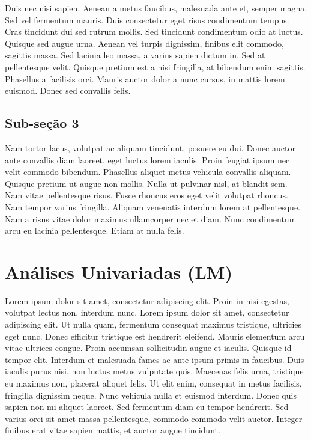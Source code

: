 \documentclass[]{book}
\begin{document}
Duis nec nisi sapien. Aenean a metus faucibus, malesuada ante et, semper magna. Sed vel fermentum mauris. Duis consectetur eget risus condimentum tempus. Cras tincidunt dui sed rutrum mollis. Sed tincidunt condimentum odio at luctus. Quisque sed augue urna. Aenean vel turpis dignissim, finibus elit commodo, sagittis massa. Sed lacinia leo massa, a varius sapien dictum in. Sed at pellentesque velit. Quisque pretium est a nisi fringilla, at bibendum enim sagittis. Phasellus a facilisis orci. Mauris auctor dolor a nunc cursus, in mattis lorem euismod. Donec sed convallis felis.

\hypertarget{sub-seuxe7uxe3o-3}{%
\section{Sub-seção 3}\label{sub-seuxe7uxe3o-3}}

Nam tortor lacus, volutpat ac aliquam tincidunt, posuere eu dui. Donec auctor ante convallis diam laoreet, eget luctus lorem iaculis. Proin feugiat ipsum nec velit commodo bibendum. Phasellus aliquet metus vehicula convallis aliquam. Quisque pretium ut augue non mollis. Nulla ut pulvinar nisl, at blandit sem. Nam vitae pellentesque risus. Fusce rhoncus eros eget velit volutpat rhoncus. Nam tempor varius fringilla. Aliquam venenatis interdum lorem at pellentesque. Nam a risus vitae dolor maximus ullamcorper nec et diam. Nunc condimentum arcu eu lacinia pellentesque. Etiam at nulla felis.

\hypertarget{anuxe1lises-univariadas-lm}{%
\chapter{Análises Univariadas (LM)}\label{anuxe1lises-univariadas-lm}}

Lorem ipsum dolor sit amet, consectetur adipiscing elit. Proin in nisi egestas, volutpat lectus non, interdum nunc. Lorem ipsum dolor sit amet, consectetur adipiscing elit. Ut nulla quam, fermentum consequat maximus tristique, ultricies eget nunc. Donec efficitur tristique est hendrerit eleifend. Mauris elementum arcu vitae ultrices congue. Proin accumsan sollicitudin augue et iaculis. Quisque id tempor elit. Interdum et malesuada fames ac ante ipsum primis in faucibus. Duis iaculis purus nisi, non luctus metus vulputate quis. Maecenas felis urna, tristique eu maximus non, placerat aliquet felis. Ut elit enim, consequat in metus facilisis, fringilla dignissim neque. Nunc vehicula nulla et euismod interdum. Donec quis sapien non mi aliquet laoreet. Sed fermentum diam eu tempor hendrerit. Sed varius orci sit amet massa pellentesque, commodo commodo velit auctor. Integer finibus erat vitae sapien mattis, et auctor augue tincidunt.
\end{document}
